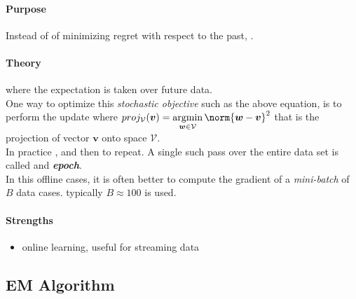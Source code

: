 \paragraph{Purpose}
Instead of of minimizing regret with respect to the past, .
\paragraph{Theory}
 where the expectation is taken over future data.\\
One way to optimize this \emph{stochastic objective} such as the above equation, is to perform the
update 
where $proj_{\mathcal{V}}(\bm{v}) = \displaystyle\argmin_{\bm{w}\in\mathcal{V}}\norm{\bm{w}-\bm{v}}^{
2}$ that is the projection of vector $\bm{v}$ onto space $\mathcal{V}$.\\
In practice , 
and then to repeat. A single such pass over the entire data set is called and 
\textbf{\emph{epoch}}.\\
In this offline cases, it is often better to compute the gradient of a \emph{mini-batch} of $B$
data cases.  typically $B\approx 100$ is used.

\paragraph{Strengths}
\begin{itemize}
    \item online learning, useful for streaming data
\end{itemize}



\subsection{EM Algorithm}
